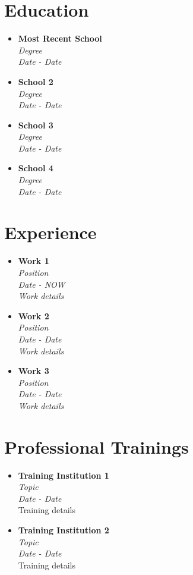 \documentclass[11pt, oneside, a4paper, titlepage]{article}
\begin{document}
\begin{tcolorbox}[grow to right by=0.75cm, colframe=white, colback=white]
\section*{Education}
\begin{itemize}
\item
{
\textbf{Most Recent School} \\
\emph{Degree} \\
\emph{Date - Date}
}
\item
{
\textbf{School 2} \\
\emph{Degree} \\
\emph{Date - Date}
}
\item
{
\textbf{School 3} \\
\emph{Degree} \\
\emph{Date - Date}
}
\item
{
\textbf{School 4} \\
\emph{Degree} \\
\emph{Date - Date}
}
\end{itemize}

\section*{Experience}
\begin{itemize}
\item
{
\textbf{Work 1} \\
\emph{Position} \\
\emph{Date - NOW} \\
\emph{Work details}
}

\item
{
\textbf{Work 2} \\
\emph{Position} \\
\emph{Date - Date} \\
\emph{Work details}
}

\item
{
\textbf{Work 3} \\
\emph{Position} \\
\emph{Date - Date}\\
\emph{Work details}
}
\end{itemize}

\section*{Professional Trainings}
\begin{itemize}
\item
{
\textbf{Training Institution 1} \\
\emph{Topic} \\
\emph{Date - Date} \\
Training details
}
\item
{
\textbf{Training Institution 2} \\
\emph{Topic} \\
\emph{Date - Date} \\
Training details
}

\end{itemize}
%
\end{tcolorbox}
\end{document}
